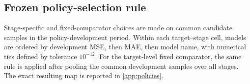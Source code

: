 \subsection{Frozen policy-selection rule}

Stage-specific and fixed-comparator choices are made on common candidate
samples in the policy-development period. Within each target--stage cell,
models are ordered by development MSE, then MAE, then model name, with numerical
ties defined by tolerance \(10^{-12}\). For the target-level fixed comparator,
the same rule is applied after pooling the common development samples over all
stages. The exact resulting map is reported in \ref{app:policies}.
